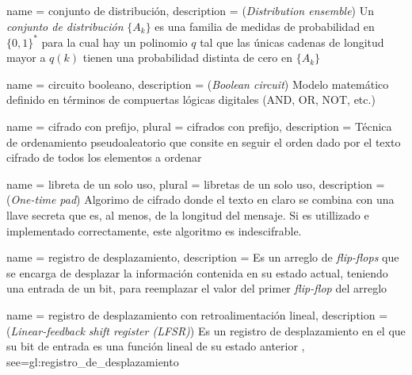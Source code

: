 {
  name = conjunto de distribución,
  description = {
    (\textit{Distribution ensemble}) Un \textit{conjunto de distribución}
    $ \{ A_k \} $ es una familia de medidas de probabilidad en $ \{0, 1\}^* $
    para la cual hay un polinomio $ q $ tal que las únicas cadenas de longitud
    mayor a $ q(k) $ tienen una probabilidad distinta de cero en
    $ \{ A_k \} $~\cite{DBLP:conf/stoc/BeaverMR90}%
  }
}

{
  name = circuito booleano,
  description = {
    (\textit{Boolean circuit}) Modelo matemático definido en términos de
    compuertas lógicas digitales (AND, OR, NOT, etc.)%
  }
}

{
  name = cifrado con prefijo,
  plural = cifrados con prefijo,
  description = {
    Técnica de ordenamiento pseudoaleatorio que consite en seguir el orden dado
    por el texto cifrado de todos los elementos a ordenar%
  }
}

{
  name = libreta de un solo uso,
  plural = libretas de un solo uso,
  description = {
    (\textit{One-time pad}) Algorimo de cifrado donde el texto en claro se combina
    con una llave secreta que es, al menos, de la longitud del mensaje. Si es
    utillizado e implementado correctamente, este algoritmo es indescifrable. %
  }
}

{
  name = registro de desplazamiento,
  description = {
    Es un arreglo de \textit{flip-flops} que se encarga de desplazar la 
    información contenida en su estado actual, teniendo una entrada de un 
    bit, para reemplazar el valor del primer \textit{flip-flop} del arreglo%
  }
}

{
  name = registro de desplazamiento con retroalimentación lineal,
  description = {
    (\textit{Linear-feedback shift register (LFSR)}) Es un registro de 
    desplazamiento en el que su bit de entrada es una función lineal de su 
    estado anterior%
  },
  see={gl:registro_de_desplazamiento}
}

\glsaddall
